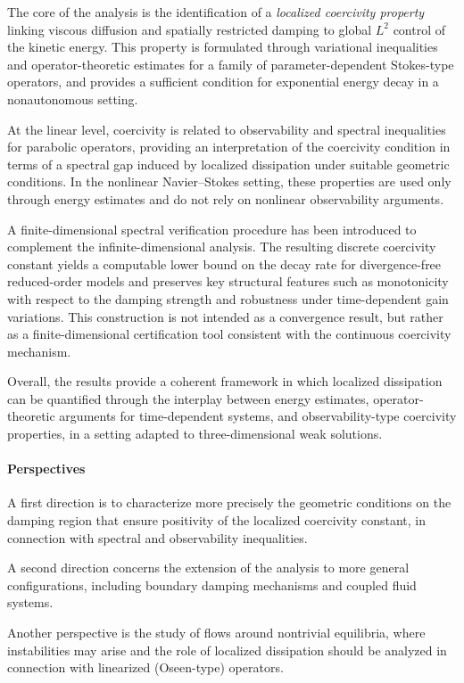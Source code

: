 \documentclass[preprint,12pt]{elsarticle}
\begin{document}
The core of the analysis is the identification of a \emph{localized coercivity
property} linking viscous diffusion and spatially restricted damping to global
$L^2$ control of the kinetic energy.
This property is formulated through variational inequalities and
operator-theoretic estimates for a family of parameter-dependent Stokes-type
operators, and provides a sufficient condition for exponential energy decay in a
nonautonomous setting.

At the linear level, coercivity is related to observability and spectral
inequalities for parabolic operators, providing an interpretation of the
coercivity condition in terms of a spectral gap induced by localized
dissipation under suitable geometric conditions.
In the nonlinear Navier--Stokes setting, these properties are used only through
energy estimates and do not rely on nonlinear observability arguments.

A finite-dimensional spectral verification procedure has been introduced to
complement the infinite-dimensional analysis.
The resulting discrete coercivity constant yields a computable lower bound on
the decay rate for divergence-free reduced-order models and preserves key
structural features such as monotonicity with respect to the damping strength
and robustness under time-dependent gain variations.
This construction is not intended as a convergence result, but rather as a
finite-dimensional certification tool consistent with the continuous coercivity
mechanism.

Overall, the results provide a coherent framework in which localized dissipation
can be quantified through the interplay between energy estimates,
operator-theoretic arguments for time-dependent systems, and
observability-type coercivity properties, in a setting adapted to
three-dimensional weak solutions.

\paragraph{Perspectives}
A first direction is to characterize more precisely the geometric conditions on
the damping region that ensure positivity of the localized coercivity constant,
in connection with spectral and observability inequalities.

A second direction concerns the extension of the analysis to more general
configurations, including boundary damping mechanisms and coupled fluid systems.

Another perspective is the study of flows around nontrivial equilibria, where
instabilities may arise and the role of localized dissipation should be analyzed
in connection with linearized (Oseen-type) operators.
\end{document}
